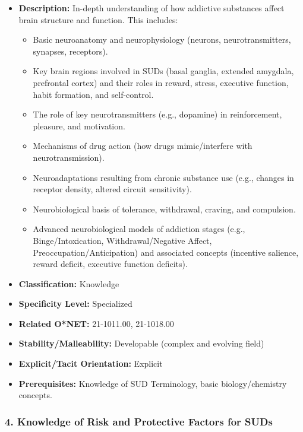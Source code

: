\documentclass[
  letterpaper,
  DIV=11,
  numbers=noendperiod]{scrartcl}
\providecommand{\tightlist}{%
  \setlength{\itemsep}{0pt}\setlength{\parskip}{0pt}}
\begin{document}
\begin{itemize}
\tightlist
\item
  \textbf{Description:} In-depth understanding of how addictive
  substances affect brain structure and function. This includes:

  \begin{itemize}
  \tightlist
  \item
    Basic neuroanatomy and neurophysiology (neurons, neurotransmitters,
    synapses, receptors).
  \item
    Key brain regions involved in SUDs (basal ganglia, extended
    amygdala, prefrontal cortex) and their roles in reward, stress,
    executive function, habit formation, and self-control.
  \item
    The role of key neurotransmitters (e.g., dopamine) in reinforcement,
    pleasure, and motivation.
  \item
    Mechanisms of drug action (how drugs mimic/interfere with
    neurotransmission).
  \item
    Neuroadaptations resulting from chronic substance use (e.g., changes
    in receptor density, altered circuit sensitivity).
  \item
    Neurobiological basis of tolerance, withdrawal, craving, and
    compulsion.
  \item
    Advanced neurobiological models of addiction stages (e.g.,
    Binge/Intoxication, Withdrawal/Negative Affect,
    Preoccupation/Anticipation) and associated concepts (incentive
    salience, reward deficit, executive function deficits).
  \end{itemize}
\item
  \textbf{Classification:} Knowledge
\item
  \textbf{Specificity Level:} Specialized
\item
  \textbf{Related O*NET:} 21-1011.00, 21-1018.00
\item
  \textbf{Stability/Malleability:} Developable (complex and evolving
  field)
\item
  \textbf{Explicit/Tacit Orientation:} Explicit
\item
  \textbf{Prerequisites:} Knowledge of SUD Terminology, basic
  biology/chemistry concepts.
\end{itemize}

\subsubsection{4. Knowledge of Risk and Protective Factors for
SUDs}\label{knowledge-of-risk-and-protective-factors-for-suds}
\end{document}
